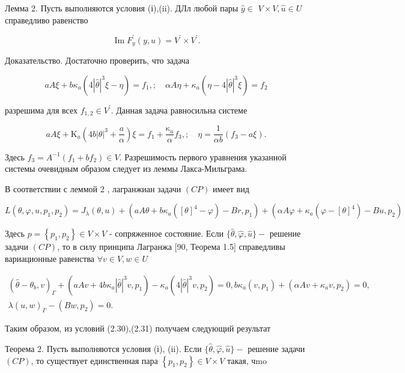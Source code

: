 \documentclass[10pt]{article}
\begin{document}
Лемма 2. Пусть выполняются условия (і),(ii). ДЛл любой пары $\hat{y} \in$ $V \times V, \hat{u} \in U$ справедливо равенство

$$
\operatorname{Im} F_{y}^{\prime}(y, u)=V^{\prime} \times V^{\prime} .
$$

Доказательство. Достаточно проверить, что задача

$$
a A \xi+b \kappa_{a}\left(4|\hat{\theta}|^{3} \xi-\eta\right)=f_{1}, ; \quad \alpha A \eta+\kappa_{a}\left(\eta-4|\hat{\theta}|^{3} \xi\right)=f_{2}
$$

разрешима для всех $f_{1,2} \in V^{\prime}$. Данная задача равносильна системе

$$
a A \xi+\mathrm{K}_{a}\left(4 b|\theta|^{3}+\frac{a}{\alpha}\right) \xi=f_{1}+\frac{\mathrm{\kappa}_{a}}{\alpha} f_{3}, ; \quad \eta=\frac{1}{\alpha b}\left(f_{3}-a \xi\right) .
$$

Здесь $f_{3}=A^{-1}\left(f_{1}+b f_{2}\right) \in V$. Разрешимость первого уравнения указанной системы очевидным образом следует из леммы Лакса-Мильграма.

В соответствии с леммой 2 , лагранжиан задачи $(C P)$ имеет вид

$L\left(\theta, \varphi, u, p_{1}, p_{2}\right)=J_{\lambda}(\theta, u)+\left(a A \theta+b \kappa_{a}\left([\theta]^{4}-\varphi\right)-B r, p_{1}\right)+\left(\alpha A \varphi+\kappa_{a}\left(\varphi-[\theta]^{4}\right)-B u, p_{2}\right)$

Здесь $p=\left\{p_{1}, p_{2}\right\} \in V \times V$ - сопряженное состояние. Если $\{\hat{\theta}, \hat{\varphi}, \hat{u}\}-$ решение задачи $(C P)$, то в силу принципа Лагранжа [90, Теорема 1.5] справедливы вариационные равенства $\forall v \in V, w \in U$

$$
\begin{gathered}
\left(\hat{\theta}-\theta_{b}, v\right)_{\Gamma}+\left(a A v+4 b \kappa_{a}|\hat{\theta}|^{3} v, p_{1}\right)-\kappa_{a}\left(4|\hat{\theta}|^{3} v, p_{2}\right)=0, b \kappa_{a}\left(v, p_{1}\right)+\left(\alpha A v+\kappa_{a} v, p_{2}\right)=0, \\
\lambda(\hat{u}, w)_{\Gamma}-\left(B w, p_{2}\right)=0 .
\end{gathered}
$$

Таким образом, из условий (2.30),(2.31) получаем следующий результат

Теорема 2. Пусть выполняются условия (і), (ii). Если $\{\hat{\theta}, \hat{\varphi}, \hat{u}\}-$ решение задачи $(C P)$, то существует единственная пара $\left\{p_{1}, p_{2}\right\} \in V \times V$ такая, чmo
\end{document}
